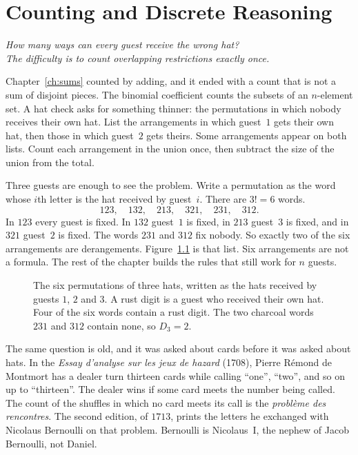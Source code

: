 \chapter{Counting and Discrete Reasoning}\label{ch:counting}

\begin{center}\itshape
How many ways can every guest receive the wrong hat?\\
The difficulty is to count overlapping restrictions exactly once.
\end{center}

Chapter~\ref{ch:sums} counted by adding, and it ended with a count that is not a sum of disjoint pieces. The binomial coefficient counts the subsets of an $n$-element set. A hat check asks for something thinner: the permutations in which nobody receives their own hat. List the arrangements in which guest~$1$ gets their own hat, then those in which guest~$2$ gets theirs. Some arrangements appear on both lists. Count each arrangement in the union once, then subtract the size of the union from the total.

Three guests are enough to see the problem. Write a permutation as the word whose $i$th letter is the hat received by guest~$i$. There are $3!=6$ words.
\[
123,\quad 132,\quad 213,\quad 321,\quad 231,\quad 312.
\]
In $123$ every guest is fixed. In $132$ guest~$1$ is fixed, in $213$ guest~$3$ is fixed, and in $321$ guest~$2$ is fixed. The words $231$ and $312$ fix nobody. So exactly two of the six arrangements are derangements. Figure~\ref{fig:hats} is that list. Six arrangements are not a formula. The rest of the chapter builds the rules that still work for $n$ guests.

\begin{figure}[ht]
\centering
{}
\caption{The six permutations of three hats, written as the hats received by guests $1$, $2$ and $3$. A rust digit is a guest who received their own hat. Four of the six words contain a rust digit. The two charcoal words $231$ and $312$ contain none, so $D_3=2$.}
\label{fig:hats}
\end{figure}

The same question is old, and it was asked about cards before it was asked about hats. In the \emph{Essay d'analyse sur les jeux de hazard} (1708), Pierre R\'emond de Montmort has a dealer turn thirteen cards while calling ``one'', ``two'', and so on up to ``thirteen''. The dealer wins if some card meets the number being called. The count of the shuffles in which no card meets its call is the \emph{probl\`eme des rencontres}. The second edition, of $1713$, prints the letters he exchanged with Nicolaus Bernoulli on that problem. Bernoulli is Nicolaus~I, the nephew of Jacob Bernoulli, not Daniel.

